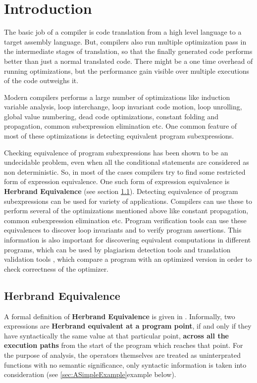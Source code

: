\chapter{Introduction}
\label{chap:chapter1}
\hspace{3mm}

The basic job of a compiler is code translation from a high level 
language to a target assembly language. But, compilers also run
multiple optimization pass in the intermediate stages of translation, 
so that the finally generated code performs better than just a normal 
translated code. There might be a one time overhead of 
running optimizations, but the performance gain visible over multiple 
executions of the code outweighs it.

Modern compilers performs a large number of optimizations like
induction variable analysis, loop interchange, loop invariant code
motion, loop unrolling, global value numbering, dead code 
optimizations, constant folding and propagation, common subexpression 
elimination etc. One common feature of most of these optimizations is 
detecting equivalent program subexpressions. 

Checking equivalence of program subexpressions has been shown to be 
an undecidable problem, even when all the conditional statements are 
considered as non deterministic. So, in most of the cases compilers 
try to find some restricted form of expression equivalence. One such
form of expression equivalence is \textbf{Herbrand Equivalence} (see section \ref{sec:HerbrandEquivalence}).
Detecting equivalence of program subexpressions can be used for 
variety of applications. Compilers can use these to perform several 
of the optimizations mentioned above like constant propagation, 
common subexpression elimination etc. Program verification tools can 
use these equivalences to discover loop invariants and to verify 
program assertions. This information is also important for discovering
equivalent computations in different programs, which can be used by
plagiarism detection tools and translation validation tools \cite
{Necula, Pnueli}, which compare a program with an optimized version
in order to check correctness of the optimizer.


\section{Herbrand Equivalence}
\label{sec:HerbrandEquivalence}
A formal definition of \textbf{Herbrand Equivalence} is given in 
\cite{Ruthing}.
Informally, two expressions are \textbf{Herbrand equivalent at a program 
point}, if and only if they have syntactically the same value at that 
particular point, \textbf{across all the execution paths} from the start 
of the program which reaches that point. For the purpose of analysis, 
the operators themselves are treated as uninterprated functions with 
no semantic significance, only syntactic information is taken into 
consideration (see \ref{sec:ASimpleExample}{example below}).

